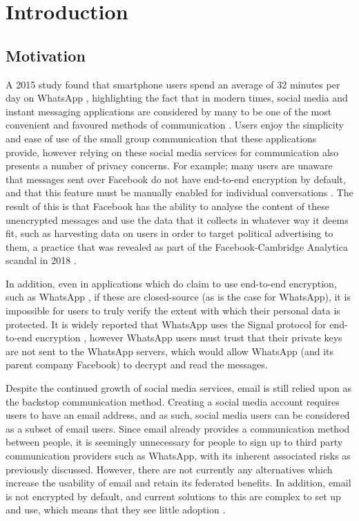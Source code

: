 \chapter{Introduction}


\section{Motivation}

A 2015 study found that smartphone users spend an average of 32 minutes per day on WhatsApp \cite{montag2015}, highlighting the fact that in modern times, social media and instant messaging applications are considered by many to be one of the most convenient and favoured methods of communication \cite{church2013}. Users enjoy the simplicity and ease of use of the small group communication that these applications provide, however relying on these social media services for communication also presents a number of privacy concerns. For example; many users are unaware that messages sent over Facebook do not have end-to-end encryption by default, and that this feature must be manually enabled for individual conversations \cite{facebook2017}. The result of this is that Facebook has the ability to analyse the content of these unencrypted messages and use the data that it collects in whatever way it deems fit, such as harvesting data on users in order to target political advertising to them, a practice that was revealed as part of the Facebook-Cambridge Analytica scandal in 2018 \cite{guardian2018}.

In addition, even in applications which do claim to use end-to-end encryption, such as WhatsApp \cite{whatsapp2017}, if these are closed-source (as is the case for WhatsApp), it is impossible for users to truly verify the extent with which their personal data is protected. It is widely reported that WhatsApp uses the Signal protocol for end-to-end encryption \cite{whatsapp2017}, however WhatsApp users must trust that their private keys are not sent to the WhatsApp servers, which would allow WhatsApp (and its parent company Facebook) to decrypt and read the messages.

Despite the continued growth of social media services, email is still relied upon as the backstop communication method. Creating a social media account requires users to have an email address, and as such, social media users can be considered as a subset of email users. Since email already provides a communication method between people, it is seemingly unnecessary for people to sign up to third party communication providers such as WhatsApp, with its inherent associated risks as previously discussed. However, there are not currently any alternatives which increase the usability of email and retain its federated benefits. In addition, email is not encrypted by default, and current solutions to this are complex to set up and use, which means that they see little adoption \cite{sheng2006johnny}.

